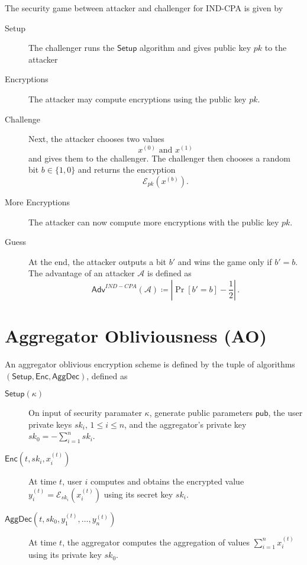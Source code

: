 \documentclass[twocolumn]{autart}
\theoremstyle{definition}
\theoremstyle{remark}
\begin{document}
The security game between attacker and challenger for IND-CPA is given by
\begin{description}
    \item[Setup] The challenger runs the $\mathsf{Setup}$ algorithm and gives public key $pk$ to the attacker
    \item[Encryptions] The attacker may compute encryptions using the public key $pk$.
    \item[Challenge] Next, the attacker chooses two values
    \begin{equation*}
        x^{(0)} \text{ and } x^{(1)}
    \end{equation*}
    and gives them to the challenger. The challenger then chooses a random bit $b \in \{1,0\}$ and returns the encryption
    \begin{equation*}
        \mathcal{E}_{pk}(x^{(b)}).
    \end{equation*}
    \item[More Encryptions] The attacker can now compute more encryptions with the public key $pk$.
    \item[Guess] At the end, the attacker outputs a bit $b'$ and wins the game only if $b' = b$. The advantage of an attacker $\mathcal{A}$ is defined as
    \begin{equation*}
        \mathsf{Adv}^{IND-CPA}(\mathcal{A}) \coloneqq \left\lvert \Pr [b'=b] - \frac{1}{2}\right\rvert\,.
    \end{equation*} 
\end{description}

\section{Aggregator Obliviousness (AO)} \label{app:ao}
An aggregator oblivious encryption scheme is defined by the tuple of algorithms $(\mathsf{Setup}, \mathsf{Enc}, \mathsf{AggDec})$, defined as
\begin{description}
    \item[$\mathsf{Setup}(\kappa)$] On input of security paramater $\kappa$, generate public parameters $\mathsf{pub}$, the user private keys $sk_i,\,1\leq i \leq n$, and the aggregator's private key $sk_0=-\sum^n_{i=1}sk_i$.
    \item[$\mathsf{Enc}(t, sk_i, x^{(t)}_i)$] At time $t$, user $i$ computes and obtains the encrypted value $y^{(t)}_i = \mathcal{E}_{sk_i}(x^{(t)}_i)$ using its secret key $sk_i$.
    \item[$\mathsf{AggDec}(t, sk_0, y^{(t)}_1,\dots,y^{(t)}_n)$] At time $t$, the aggregator computes the aggregation of values $\sum^{n}_{i=1} x^{(t)}_i$ using its private key $sk_0$.
\end{description}
\end{document}

